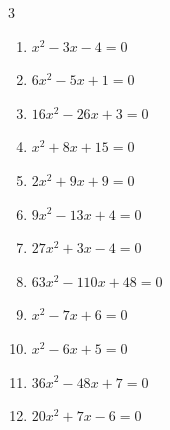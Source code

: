 \begin{multicols}{3}
\begin{enumerate}

  \item $x^{2}-3x-4=0$

        \phantom{$\displaystyle x=4,\; -1$}

  \item $6x^{2}-5x+1=0$


  \item $16x^{2}-26x+3=0$


  \item $x^{2}+8x+15=0$

        \phantom{$\displaystyle x=-5,\; -3$}

\columnbreak %

\resetques

  \item $2x^{2}+9x+9=0$


  \item $9x^{2}-13x+4=0$


  \item $27x^{2}+3x-4=0$


  \item $63x^{2}-110x+48=0$


  \item $x^{2}-7x+6=0$

        \phantom{$\displaystyle x=6,\; 1$}

  \item $x^{2}-6x+5=0$

        \phantom{$\displaystyle x=5,\; 1$}

  \item $36x^{2}-48x+7=0$


  \item $20x^{2}+7x-6=0$



\end{enumerate}
\end{multicols}
